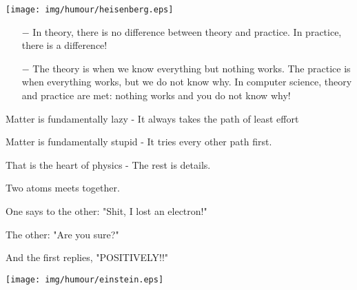 	\begin{center}
	\texttt{[image: img/humour/heisenberg.eps]}
	\end{center}
	
	\begin{center}\underline{\hspace{5 cm}}\end{center}	
	
	\begin{itemize}	 
		\item[$-$] In theory, there is no difference between theory and practice. In practice, there is a difference!
	
		\item[$-$] The theory is when we know everything but nothing works. The practice is when everything works, but we do not know why. In computer science, theory and practice are met: nothing works and you do not know why!
	\end{itemize}

	\begin{center}\underline{\hspace{5 cm}}\end{center}

	Matter is fundamentally lazy - It always takes the path of least effort
	
	Matter is fundamentally stupid - It tries every other path first.
	
	That is the heart of physics - The rest is details.
	
	\begin{center}\underline{\hspace{5 cm}}\end{center}
	
	Two atoms meets together. 
	
	One says to the other: "Shit, I lost an electron!"
	
	The other: "Are you sure?"
	
	And the first replies, "POSITIVELY!!"
	
	\begin{center}\underline{\hspace{5 cm}}\end{center}

	\begin{center}
	\texttt{[image: img/humour/einstein.eps]}
	\end{center}
	
	\begin{center}\underline{\hspace{5 cm}}\end{center}	
	
